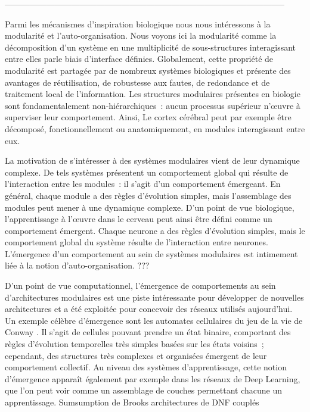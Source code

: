 -----------------------------------------------------------------------------------------------------

Parmi les mécanismes d'inspiration biologique nous nous intéressons à la modularité et l'auto-organisation.
Nous voyons ici la modularité comme la décomposition d'un système en une multiplicité de sous-structures interagissant entre elles parle biais d'interface définies.
Globalement, cette propriété de modularité est partagée par de nombreux systèmes biologiques et 
présente des avantages de réutilisation, de robustesse aux fautes, de redondance et de traitement local de l'information.
Les structures modulaires présentes en biologie sont fondamentalement non-hiérarchiques~: aucun processus supérieur n'\oe{}uvre à superviser leur comportement. Ainsi, 
Le cortex cérébral peut par exemple être décomposé, fonctionnellement ou anatomiquement, en modules interagissant entre eux.

La motivation de s'intéresser à des systèmes modulaires vient de leur dynamique complexe. De tels systèmes présentent un comportement global qui résulte de l'interaction entre les modules~: il s'agit d'un comportement émergeant. En général, chaque module a des règles d'évolution simples, mais l'assemblage des modules peut mener à une dynamique complexe.
D'un point de vue biologique, l'apprentissage à l'\oe{}uvre dans le cerveau peut ainsi être défini comme un comportement émergent. Chaque neurone a des règles d'évolution simples, mais le comportement global du système résulte de l'interaction entre neurones. 
L'émergence d'un comportement au sein de systèmes modulaires est intimement liée à la notion d'auto-organisation.
???

D'un point de vue computationnel, l'émergence de comportements au sein d'architectures modulaires est une piste intéressante pour développer de nouvelles architectures et a été exploitée pour concevoir des réseaux utilisés aujourd'hui. Un exemple célèbre d'émergence sont les automates cellulaires du jeu de la vie de Conway \cite{Gardener1970MathematicalGT}. Il s'agit de cellules pouvant prendre un état binaire, comportant des règles d'évolution temporelles très simples basées sur les états voisins~; cependant, des structures très complexes et organisées émergent de leur comportement collectif.
Au niveau des systèmes d'apprentissage, cette notion d'émergence apparaît également par exemple dans les réseaux de Deep Learning, que l'on peut voir comme un assemblage de couches permettant chacune un apprentissage.
Sumsumption de Brooks 
architectures de DNF couplés 

